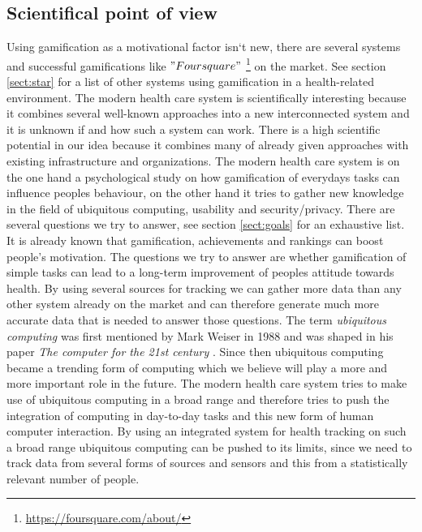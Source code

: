 \documentclass[a4paper,11pt]{article}
\begin{document}
\subsection{Scientifical point of view}
Using gamification as a motivational factor isn‘t new, there are several systems and successful gamifications like $"Foursquare"$ \footnote{\url{https://foursquare.com/about/}} on the market. See section \ref{sect:star} for a list of other systems using gamification in a health-related environment. The modern health care system is scientifically interesting because it combines several well-known approaches into a new interconnected system and it is unknown if and how such a system can work. There is a high scientific potential in our idea because it combines many of already given approaches with existing infrastructure and organizations. The modern health care system is on the one hand a psychological study on how gamification of everydays tasks can influence peoples behaviour, on the other hand it tries to gather new knowledge in the field of ubiquitous computing, usability and security/privacy. There are several questions we try to answer, see section \ref{sect:goals} for an exhaustive list. \\

It is already known that gamification, achievements and rankings can boost people's motivation. The questions we try to answer are whether gamification of simple tasks can lead to a long-term improvement of peoples attitude towards health. By using several sources for tracking we can gather more data than any other system already on the market and can therefore generate much more accurate data that is needed to answer those questions. The term \emph{ubiquitous computing} was first mentioned by Mark Weiser in 1988 and was shaped in his paper \emph{The computer for the 21st century} \cite{weiser99}. Since then ubiquitous computing became a trending form of computing which we believe will play a more and more important role in the future. The modern health care system tries to make use of ubiquitous computing in a broad range and therefore tries to push the integration of computing in day-to-day tasks and this new form of human computer interaction. By using an integrated system for health tracking on such a broad range ubiquitous computing can be pushed to its limits, since we need to track data from several forms of sources and sensors and this from a statistically relevant number of people. \\
\end{document}
